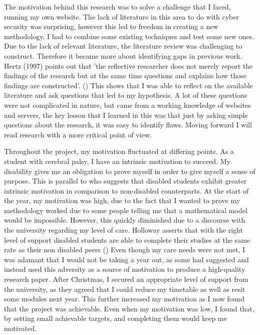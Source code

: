 

The motivation behind this research was to solve a challenge that I faced, running my own website. The lack of literature in this area to do with cyber security was surprising, however this led to freedom in creating a new methodology. I had to combine some existing techniques and test some new ones. Due to the lack of relevant literature, the literature review was challenging to construct. Therefore it became more about identifying gaps in previous work. Hertz (1997) points out that 'the reflective researcher does not merely report the findings of the research but at the same time questions and explains how those findings are constructed'. (\cite{hertz1996introduction}) This shows that I was able to reflect on the available literature and ask questions that led to my hypothesis. A lot of these questions were not complicated in nature, but came from a working knowledge of websites and servers, the key lesson that I learned in this was that just by asking simple questions about the research, it was easy to identify flaws. Moving forward I will read research with a more critical point of view.

Throughout the project, my motivation fluctuated at differing points. As a student with cerebral palsy, I have an intrinsic motivation to succeed. My disability gives  me an obligation to prove myself in order to give myself a sense of purpose. This is parallel to \cite{bye2007motivation} who suggests that disabled students exhibit greater intrinsic motivation in comparison to non-disabled counterparts. At the start of the year, my motivation was high, due to the fact that I wanted to prove my methodology worked due to some people telling me that a mathematical model would be impossible. However, this quickly diminished due to a discourse with the university regarding my level of care. Holloway asserts that with the right level of support disabled students are able to complete their studies at the same rate as their non disabled peers (\cite{holloway2001experience}) Even though my care needs were not met, I was adamant that I would not be taking a year out, as some had suggested and instead used this adversity as a source of motivation to produce a high-quality research paper. After Christmas, I secured an appropriate level of support from the university, as they agreed that I could reduce my timetable as well as resit some modules next year. This further increased my motivation as I now found that the project was achievable. Even when my motivation was low, I found that, by setting small achievable targets, and completing them would keep me motivated.